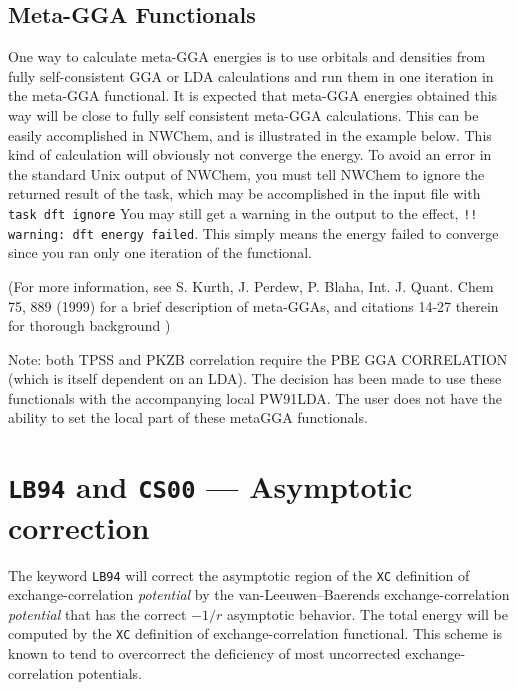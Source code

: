 %



\subsection{Meta-GGA Functionals}


One way to calculate meta-GGA energies is to use
 orbitals and densities 
from fully self-consistent GGA or LDA calculations
and run them in one iteration in the meta-GGA functional.
It is expected that meta-GGA energies obtained
this way will be close to fully self consistent
meta-GGA calculations. 
This can be easily accomplished in NWChem,
and is illustrated in
the example below.
This kind of calculation
will obviously not converge the energy.
To avoid an error  in
the standard Unix output of NWChem,
you must tell NWChem
 to ignore 
the returned result of the task, 
which may be accomplished in the input file
 with \verb+ task dft ignore+
You may still get a warning in the output to the effect,
\verb+!! warning: dft energy failed+.
This simply means the energy failed to converge
since you  ran  only one iteration of
the  functional.

(For more information,  see
S. Kurth, J. Perdew, P. Blaha, Int. J. Quant. Chem 75, 889 (1999)
for a brief description of meta-GGAs, and  citations 14-27
therein for thorough background )

Note:  both TPSS and PKZB correlation
require the PBE GGA CORRELATION (which is itself dependent on an LDA).  
The decision has been made to
use these functionals with the accompanying local
PW91LDA.  The user does not have the ability to set
the local part of these metaGGA functionals.


\section{{\tt LB94} and {\tt CS00} --- Asymptotic correction}

The keyword \verb+LB94+ will correct the asymptotic region of 
the \verb+XC+ definition of exchange-correlation {\it potential} by 
the van-Leeuwen--Baerends exchange-correlation {\it potential} that
has the correct $-1/r$ asymptotic behavior.  The total energy will be computed by the 
\verb+XC+ definition of exchange-correlation functional.  This scheme is known to
tend to overcorrect the deficiency of most uncorrected exchange-correlation potentials.

